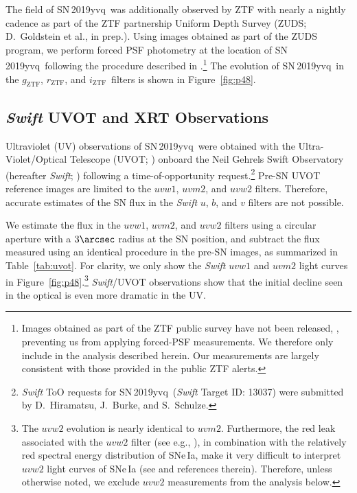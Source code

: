 \documentclass[twocolumn]{aastex63}
\newcommand{\rztf}{$r_\mathrm{ZTF}$}
\newcommand{\gztf}{$g_\mathrm{ZTF}$}
\newcommand{\iztf}{$i_\mathrm{ZTF}$}
\newcommand{\sn}{SN\,2019yvq}
\begin{document}
The field of \sn\ was additionally observed by ZTF with nearly a nightly
cadence as part of the ZTF partnership Uniform Depth Survey (ZUDS;
D.~Goldstein et al., in prep.). Using images obtained as part of the ZUDS
program, we perform forced PSF photometry at the location of \sn\ following
the procedure described in \citet{Yao19}.\footnote{Images \edit1{of \sn}
obtained as part of the ZTF public survey have not been released, , preventing us from
applying forced-PSF measurements. We therefore only include  in the analysis described herein. Our
measurements are largely consistent with those provided in the public ZTF
alerts.} The evolution of \sn\ in the \gztf, \rztf, and \iztf\ filters is
shown in Figure~\ref{fig:p48}.

\subsection{\textit{Swift} UVOT and XRT Observations}\label{sec:swift}



Ultraviolet (UV) observations of \sn\ were obtained with the
Ultra-Violet/Optical Telescope (UVOT; \citealt{Roming05}) onboard the Neil
Gehrels Swift Observatory (hereafter \textit{Swift}; \citealt{Gehrels04})
following a time-of-opportunity request.\footnote{\textit{Swift} ToO requests
for \sn\ (\textit{Swift} Target ID: 13037) were submitted by D.~Hiramatsu,
J.~Burke, and S.~Schulze.} Pre-SN UVOT reference images are limited to the
$uvw1$, $uvm2$, and $uvw2$ filters. Therefore, accurate estimates of the SN
flux in the \textit{Swift} $u$, $b$, and $v$ filters are not possible.

We estimate the flux in the $uvw1$, $uvm2$, and $uvw2$ filters using a
circular aperture with a $3\arcsec$ radius at the SN position, and subtract
the flux measured using an identical procedure in the pre-SN images, as
summarized in Table~\ref{tab:uvot}. For clarity, we only show the
\textit{Swift} $uvw1$ and $uvm2$ light curves in
Figure~\ref{fig:p48}.\footnote{The $uvw2$ evolution is nearly identical to
$uvm2$. Furthermore, the red leak associated with the $uvw2$ filter (see e.g.,
\citealt{Breeveld11}), in combination with the relatively red spectral energy
distribution of SNe\,Ia, make it very difficult to interpret $uvw2$ light
curves of SNe\,Ia (see \citealt{Brown17} and references therein). Therefore,
unless otherwise noted, we exclude $uvw2$ measurements from the analysis
below.} \textit{Swift}/UVOT observations show that the initial decline seen in
the optical is even more dramatic in the UV.
\end{document}
